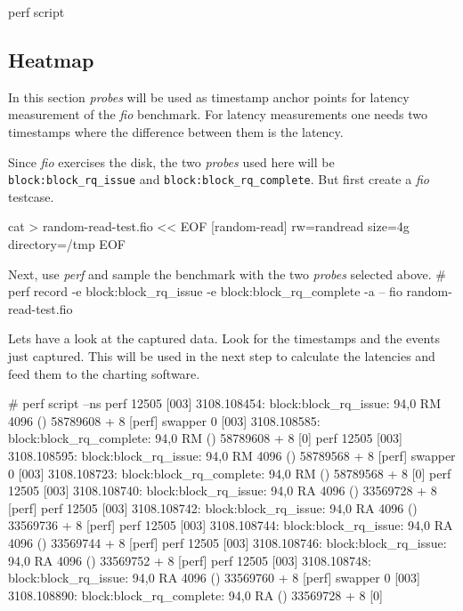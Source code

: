  perf script
\stoptyping


\subsection{Heatmap}

In this section {\em probes}
will be used as timestamp anchor points for latency measurement of the
{\em fio} benchmark. For latency measurements one needs two timestamps
where the difference between them is the latency.

Since {\em fio} exercises the disk, the two {\em probes} used here will
be {\tt block:block_rq_issue} and {\tt block:block_rq_complete}.
But first create a {\em fio} testcase.

\starttyping
cat > random-read-test.fio << EOF
[random-read]
rw=randread
size=4g
directory=/tmp
EOF
\stoptyping

Next, use {\em perf} and sample the benchmark with the two {\em probes}
selected above.
\starttyping
# perf record -e block:block_rq_issue -e block:block_rq_complete -a -- fio random-read-test.fio
\stoptyping

Lets have a look at the captured data. Look for the timestamps and the events
just captured. This will be used in the next step to calculate the latencies
and feed them to the charting software.

\starttyping
# perf script --ns
            perf 12505 [003]  3108.108454:    block:block_rq_issue: 94,0 RM 4096 () 58789608 + 8 [perf]
         swapper     0 [003]  3108.108585: block:block_rq_complete: 94,0 RM () 58789608 + 8 [0]
            perf 12505 [003]  3108.108595:    block:block_rq_issue: 94,0 RM 4096 () 58789568 + 8 [perf]
         swapper     0 [003]  3108.108723: block:block_rq_complete: 94,0 RM () 58789568 + 8 [0]
            perf 12505 [003]  3108.108740:    block:block_rq_issue: 94,0 RA 4096 () 33569728 + 8 [perf]
            perf 12505 [003]  3108.108742:    block:block_rq_issue: 94,0 RA 4096 () 33569736 + 8 [perf]
            perf 12505 [003]  3108.108744:    block:block_rq_issue: 94,0 RA 4096 () 33569744 + 8 [perf]
            perf 12505 [003]  3108.108746:    block:block_rq_issue: 94,0 RA 4096 () 33569752 + 8 [perf]
            perf 12505 [003]  3108.108748:    block:block_rq_issue: 94,0 RA 4096 () 33569760 + 8 [perf]
         swapper     0 [003]  3108.108890: block:block_rq_complete: 94,0 RA () 33569728 + 8 [0]

